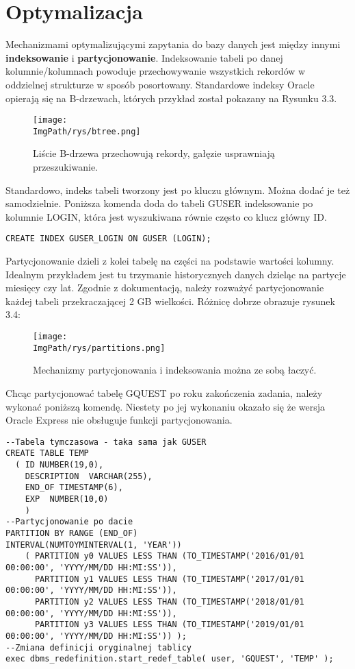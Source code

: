 \documentclass[a4paper,12pt,twoside,openany]{report}
\newcommand{\ImgPath}{.}
\begin{document}
\section{Optymalizacja}
Mechanizmami optymalizującymi zapytania do bazy danych jest między innymi \textbf{indeksowanie} i \textbf{partycjonowanie}. Indeksowanie tabeli po danej kolumnie/kolumnach powoduje przechowywanie wszystkich rekordów w oddzielnej strukturze w sposób posortowany. Standardowe indeksy Oracle opierają się na B-drzewach, których przykład został pokazany na Rysunku 3.3.
				\begin{figure}[!htbp]
					\begin{center}
						\centering
						\texttt{[image: \\ImgPath/rys/btree.png]}
					\end{center}
					\caption{Liście B-drzewa przechowują rekordy, gałęzie usprawniają przeszukiwanie.}
					\label{UMLTS}
				\end{figure}
Standardowo, indeks tabeli tworzony jest po kluczu głównym. Można dodać je też samodzielnie. Poniższa komenda doda do tabeli GUSER indeksowanie po kolumnie LOGIN, która jest wyszukiwana równie często co klucz główny ID.
\begin{lstlisting}
CREATE INDEX GUSER_LOGIN ON GUSER (LOGIN);
\end{lstlisting}
Partycjonowanie dzieli z kolei tabelę na części na podstawie wartości kolumny. Idealnym przykładem jest tu trzymanie historycznych danych  dzieląc na partycje miesięcy czy lat. Zgodnie z dokumentacją, należy rozważyć partycjonowanie każdej tabeli przekraczającej 2 GB wielkości. Różnicę dobrze obrazuje rysunek 3.4:
				\begin{figure}[!htbp]
					\begin{center}
						\centering
						\texttt{[image: \\ImgPath/rys/partitions.png]}
					\end{center}
					\caption{Mechanizmy partycjonowania i indeksowania można ze sobą łaczyć.}
					\label{UMLTS}
				\end{figure}
Chcąc partycjonować tabelę GQUEST po roku zakończenia zadania, należy wykonać poniższą komendę. Niestety po jej wykonaniu okazało się że wersja Oracle Express nie obsługuje funkcji partycjonowania.
\begin{lstlisting}
--Tabela tymczasowa - taka sama jak GUSER
CREATE TABLE TEMP
  ( ID NUMBER(19,0),
    DESCRIPTION  VARCHAR(255),
    END_OF TIMESTAMP(6),
    EXP  NUMBER(10,0)
    )
--Partycjonowanie po dacie
PARTITION BY RANGE (END_OF) 
INTERVAL(NUMTOYMINTERVAL(1, 'YEAR'))
    ( PARTITION y0 VALUES LESS THAN (TO_TIMESTAMP('2016/01/01 00:00:00', 'YYYY/MM/DD HH:MI:SS')),
      PARTITION y1 VALUES LESS THAN (TO_TIMESTAMP('2017/01/01 00:00:00', 'YYYY/MM/DD HH:MI:SS')),
      PARTITION y2 VALUES LESS THAN (TO_TIMESTAMP('2018/01/01 00:00:00', 'YYYY/MM/DD HH:MI:SS')),
      PARTITION y3 VALUES LESS THAN (TO_TIMESTAMP('2019/01/01 00:00:00', 'YYYY/MM/DD HH:MI:SS')) );
--Zmiana definicji oryginalnej tablicy    
exec dbms_redefinition.start_redef_table( user, 'GQUEST', 'TEMP' );
\end{lstlisting}
\end{document}
